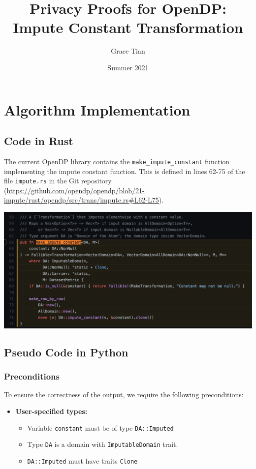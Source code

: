 \documentclass[11pt,a4paper]{article}
\title{Privacy Proofs for OpenDP: Impute Constant Transformation}
\author{Grace Tian}
\date{Summer 2021}
\begin{document}
\maketitle
\tableofcontents

\section{Algorithm Implementation}
\subsection{Code in Rust}
The current OpenDP library contains the \texttt{make\_impute\_constant} function implementing the impute constant function. This is defined in lines 62-75 of the file \texttt{impute.rs} in the Git repository (\url{https://github.com/opendp/opendp/blob/21-impute/rust/opendp/src/trans/impute.rs#L62-L75}).

\includegraphics[width=\textwidth]{make_impute_constant.jpg}


\subsection{Pseudo Code in Python}\label{sec:pseudocode}

\subsubsection*{Preconditions}
To ensure the correctness of the output, we require the following preconditions:

\begin{itemize}
    \item \textbf{User-specified types:}
    \begin{itemize}
        \item Variable \texttt{\texttt{constant}} must be of type \texttt{DA::Imputed}
        \item Type \texttt{DA} is a domain with \texttt{ImputableDomain} trait. %
        \item \texttt{DA::Imputed} must have traits \texttt{Clone}
    \end{itemize}
\end{itemize}
\end{document}
